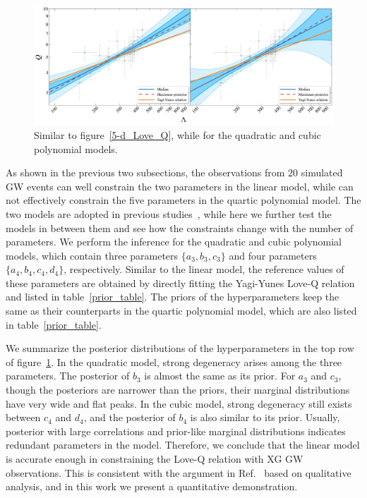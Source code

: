 \documentclass[a4paper,11pt]{article}
\newcommand{\ZW}[1]{\textcolor{magenta}{$\mathcal{ZW}$:~#1}}
\begin{document}
\begin{figure}[t]
    \begin{minipage}[t]{\textwidth}
    \includegraphics[width=\linewidth]{hierarchical_results_APR4_3d.pdf}
    \end{minipage}
    \caption{Similar to figure~\ref{5-d_Love_Q}, while for the quadratic and
    cubic polynomial models.
    }\label{3-d_4-d_Love_Q}
\end{figure}
As shown in the previous two subsections, the observations from 20 simulated GW 
events can well constrain the two parameters in the linear model, while can not 
effectively constrain the five parameters in the quartic polynomial model. The two 
models are adopted in previous studies~\cite{Yagi:2013awa, Samajdar:2020xrd}, 
while here we further test the models in between them and see how the constraints 
change with the number of parameters. We perform the inference for the quadratic 
and cubic polynomial models, which contain three parameters $\{a_3, b_3, c_3\}$ 
and four parameters $\{a_4, b_4, c_4, d_4\}$, respectively. Similar to the linear 
model, the reference values of these parameters are obtained by directly fitting 
the Yagi-Yunes Love-Q relation and listed in table~\ref{prior_table}. The priors of the
hyperparameters keep the same as their counterparts in the quartic polynomial 
model, which are also listed in table~\ref{prior_table}.

We summarize the posterior distributions of the hyperparameters in the top row of 
figure~\ref{3-d_4-d_Love_Q}. In the quadratic model, strong degeneracy arises 
among the three parameters. The posterior of $b_3$ is almost the same as its 
prior. For $a_3$ and $c_3$, though the posteriors are narrower than the priors, 
their marginal distributions have very wide and flat peaks. In the cubic model, 
strong degeneracy still exists between $c_4$ and $d_4$, and the posterior of $b_4$ 
is also similar to its prior. Usually, posterior with large correlations and 
prior-like marginal distributions indicates redundant parameters in the model. 
Therefore, we conclude that the linear model is accurate enough in constraining 
the Love-Q relation with XG GW observations. This is consistent with the argument 
in Ref.~\cite{Samajdar:2020xrd} based on qualitative analysis, and in this work we present a quantitative demonstration. 
\end{document}
